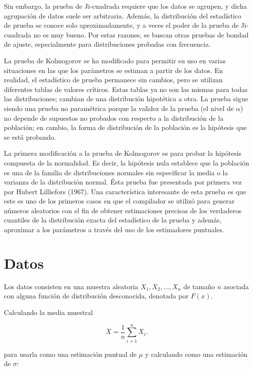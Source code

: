 \documentclass[
  a4paper,
  oneside,
  openany]{book}
\begin{document}
Sin embargo, la prueba de Ji-cuadrada requiere que los datos se agrupen, y dicha agrupación de datos suele ser arbitraria. Además, la distribución del estadístico de prueba se conoce solo aproximadamente, y a veces el poder de la prueba de Ji-cuadrada no es muy bueno. Por estas razones, se buscan otras pruebas de bondad de ajuste, especialmente para distribuciones probadas con frecuencia.

La prueba de Kolmogorov se ha modificado para permitir su uso en varias situaciones en las que los parámetros se estiman a partir de los datos. En realidad, el estadístico de prueba permanece sin cambios, pero se utilizan diferentes tablas de valores críticos. Estas tablas ya no son las mismas para todas las distribuciones; cambian de una distribución hipotética a otra. La prueba sigue siendo una prueba no paramétrica porque la validez de la prueba (el nivel de \(\alpha\)) no depende de supuestos no probados con respecto a la distribución de la población; en cambio, la forma de distribución de la población es la hipótesis que se está probando.

La primera modificación a la prueba de Kolmogorov es para probar la hipótesis compuesta de la normalidad. Es decir, la hipótesis nula establece que la población es una de la familia de distribuciones normales sin especificar la media o la varianza de la distribución normal. Ésta prueba fue presentada por primera vez por Hubert Lilliefors (1967). Una característica interesante de esta prueba es que este es uno de los primeros casos en que el compilador se utilizó para generar números aleatorios con el fin de obtener estimaciones precisas de los verdaderos cuantiles de la distribución exacta del estadístico de la prueba y además, aproximar a los parámetros a través del uso de los estimadores puntuales.

\hypertarget{datos-16}{%
\section{Datos}\label{datos-16}}

Los datos consisten en una muestra aleatoria \(X_{1},X_{2},\ldots,X_{n}\) de tamaño \(n\) asociada con alguna función de distribución desconocida, denotada por \(F(x)\).

Calculando la media muestral

\[\overline{X}=\frac{1}{n}\sum_{i=1}^{n}X_{i}.\]

para usarla como una estimación puntual de \(\mu\) y calculando como una estimación de \(\sigma:\)
\end{document}
